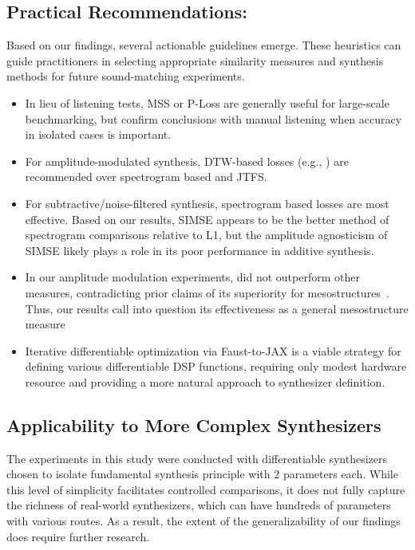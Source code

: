 \subsection{Practical Recommendations:}
Based on our findings, several actionable guidelines emerge. These heuristics can guide practitioners in selecting appropriate similarity measures and synthesis methods for future sound-matching experiments.
\begin{itemize}
    \item In lieu of listening tests, MSS or P-Loss are generally useful for large-scale benchmarking, but confirm conclusions with manual listening when accuracy in isolated cases is important. 
    \item For amplitude-modulated synthesis, DTW-based losses (e.g., \DTWEnv{}) are recommended over spectrogram based and JTFS. 
    \item For subtractive/noise-filtered synthesis, spectrogram based losses are most effective. Based on our results, SIMSE appears to be the better method of spectrogram comparisons relative to L1, but the amplitude agnosticism of SIMSE likely plays a role in its poor performance in additive synthesis.  
    \item In our amplitude modulation experiments, \JTFS{} did not outperform other measures, contradicting prior claims of its superiority for mesostructures~\cite{vahidi2023mesostructures}. Thus, our results call into question its effectiveness as a general mesostructure measure
    \item Iterative differentiable optimization via Faust-to-JAX is a viable strategy for defining various differentiable DSP functions, requiring only modest hardware resource and providing a more natural approach to synthesizer definition.
\end{itemize}

\subsection{Applicability to More Complex Synthesizers}
The experiments in this study were conducted with differentiable synthesizers chosen to isolate fundamental synthesis principle with 2 parameters each. While this level of simplicity facilitates controlled comparisons, it does not fully capture the richness of real-world synthesizers, which can have hundreds of parameters with various routes. As a result, the extent of the generalizability of our findings does require further research. 

